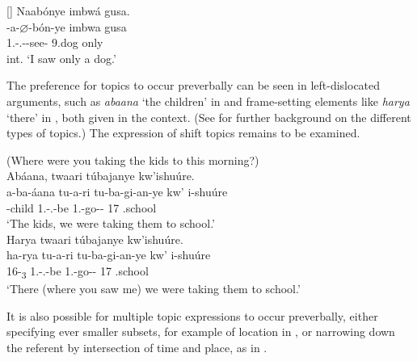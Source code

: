 \documentclass[output=paper]{langscibook}
\begin{document}
\ex
[]{
\label{bkm:Ref142557423:b}
Naabónye imbwá gusa.\\
\gll
\N{}-a-$\varnothing$-bón-ye  imbwa  gusa\\
1\SG.\SM-\N.\PST-\CJ{}-see-\PFV{}  9.dog  only\\
\glt
int. ‘I saw only a dog.’\\
}

\z\z

The preference for topics to occur preverbally can be seen in left-dislocated arguments, such as \textit{abaana} ‘the children’ in  and frame-setting elements like \textit{harya} ‘there’ in , both given in the context. (See \citealt{chapters/intro} for further background on the different types of topics.) The expression of shift topics remains to be examined.

\ea
(Where were you taking the kids to this morning?)\\
\ea
\label{bkm:Ref73810020}
Abáana, twaari túbajanye kw’ishuúre.\\
\gll
a-ba-áana  tu-a-ri  tu-ba-gi-an-ye  kw’  i-shuúre\\
-child  1\PL.\SM-\N.\PST{}-be  1\PL.\OM-{}go-\ASS-\PFV{}  17  .school\\
\glt
‘The kids, we were taking them to school.’\\

\ex
\label{bkm:Ref73810045}
Harya twaari túbajanye kw’ishuúre.\\
\gll
ha-rya  tu-a-ri  tu-ba-gi-an-ye  kw’  i-shuúre\\
16-\DEM{}\textsubscript{3}  1\PL.\SM-\N.\PST{}-be  1\PL.\OM{}-go-\ASS-\PFV{}  17  .school\\
\glt
‘There (where you saw me) we were taking them to school.’\\

\z
\z

It is also possible for multiple topic expressions to occur preverbally, either specifying ever smaller subsets, for example of location in , or narrowing down the referent by intersection of time and place, as in .
\end{document}

